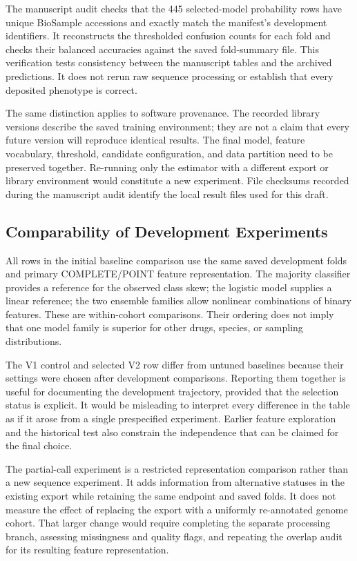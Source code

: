 \documentclass[conference]{IEEEtran}
\begin{document}
The manuscript audit checks that the 445 selected-model probability rows have unique BioSample accessions and exactly match the manifest's development identifiers. It reconstructs the thresholded confusion counts for each fold and checks their balanced accuracies against the saved fold-summary file. This verification tests consistency between the manuscript tables and the archived predictions. It does not rerun raw sequence processing or establish that every deposited phenotype is correct.

The same distinction applies to software provenance. The recorded library versions describe the saved training environment; they are not a claim that every future version will reproduce identical results. The final model, feature vocabulary, threshold, candidate configuration, and data partition need to be preserved together. Re-running only the estimator with a different export or library environment would constitute a new experiment. File checksums recorded during the manuscript audit identify the local result files used for this draft.

\subsection{Comparability of Development Experiments}
All rows in the initial baseline comparison use the same saved development folds and primary COMPLETE/POINT feature representation. The majority classifier provides a reference for the observed class skew; the logistic model supplies a linear reference; the two ensemble families allow nonlinear combinations of binary features. These are within-cohort comparisons. Their ordering does not imply that one model family is superior for other drugs, species, or sampling distributions.

The V1 control and selected V2 row differ from untuned baselines because their settings were chosen after development comparisons. Reporting them together is useful for documenting the development trajectory, provided that the selection status is explicit. It would be misleading to interpret every difference in the table as if it arose from a single prespecified experiment. Earlier feature exploration and the historical test also constrain the independence that can be claimed for the final choice.

The partial-call experiment is a restricted representation comparison rather than a new sequence experiment. It adds information from alternative statuses in the existing export while retaining the same endpoint and saved folds. It does not measure the effect of replacing the export with a uniformly re-annotated genome cohort. That larger change would require completing the separate processing branch, assessing missingness and quality flags, and repeating the overlap audit for its resulting feature representation.
\end{document}
